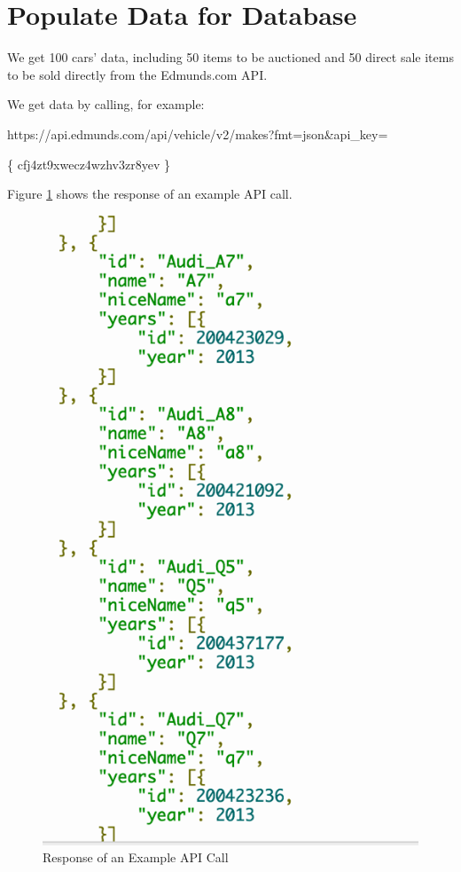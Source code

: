 \documentclass[12pt]{article}
\begin{document}
\section{Populate Data for Database}
\par We get 100 cars' data, including 50 items to be auctioned and 50 direct sale items to be sold directly from the Edmunds.com API.
\par We get data by calling, for example:
\par https://api.edmunds.com/api/vehicle/v2/makes?fmt=json\&api\_key=\par\{ cfj4zt9xwecz4wzhv3zr8yev \}
\par Figure \ref{api_car} shows the response of an example API call.
\begin{figure}[!h]
\caption{Response of an Example API Call} \label{api_car}
\begin{center}
\includegraphics[width=13cm]{api_car}
\end{center}
\end{figure}
\end{document}
